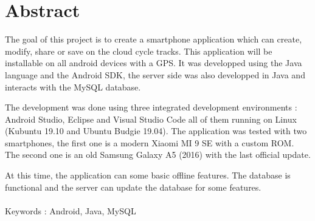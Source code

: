 \documentclass[a4paper, 12pt]{report}
\begin{document}
\section{Abstract}
\indent
  The goal of this project is to create a smartphone application which can create, modify, share or save on the cloud cycle tracks. 
  This application will be installable on all android devices with a GPS. 
  It was developped using the Java language and the Android SDK, the server side was also developped in Java and interacts with the MySQL database.
  \\\par
  The development was done using three integrated development environments : Android Studio, Eclipse and Visual Studio Code all of them running on Linux (Kubuntu 19.10 and Ubuntu Budgie 19.04).
  The application was tested with two smartphones, the first one is a modern Xiaomi MI 9 SE with a custom ROM. The second one is an old Samsung Galaxy A5 (2016) with the last official update.
  \\\par
  At this time, the application can some basic offline features. The database is functional and the server can update the database for some features.
  \\\\
  Keywords : Android, Java, MySQL
\newpage
\tableofcontents
\newpage
{}

\newpage


\setcounter{secnumdepth}{2}





\setcounter{secnumdepth}{0}

\newpage

\newpage

\end{document}
